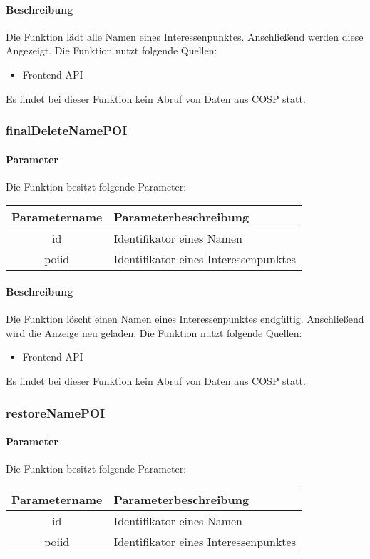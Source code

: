 \paragraph{Beschreibung} Die Funktion lädt alle Namen eines Interessenpunktes. Anschließend werden diese Angezeigt. Die Funktion nutzt folgende Quellen:
\begin{itemize}
	\item Frontend-API
\end{itemize}
Es findet bei dieser Funktion kein Abruf von Daten aus {\glqq COSP\grqq} statt.
\subsubsection{finalDeleteNamePOI}
\paragraph{Parameter} Die Funktion besitzt folgende Parameter:
\begin{table}[H]
	\begin{tabular}{|c|p{11cm}|}
		\hline
		\textbf{Parametername} & \textbf{Parameterbeschreibung} \\ \hline
		id    & Identifikator eines Namen \\ \hline
		poiid & Identifikator eines Interessenpunktes \\ \hline
	\end{tabular}
\end{table}
\paragraph{Beschreibung} Die Funktion löscht einen Namen eines Interessenpunktes endgültig. Anschließend wird die Anzeige neu geladen. Die Funktion nutzt folgende Quellen:
\begin{itemize}
	\item Frontend-API
\end{itemize}
Es findet bei dieser Funktion kein Abruf von Daten aus {\glqq COSP\grqq} statt.
\subsubsection{restoreNamePOI}
\paragraph{Parameter} Die Funktion besitzt folgende Parameter:
\begin{table}[H]
	\begin{tabular}{|c|p{11cm}|}
		\hline
		\textbf{Parametername} & \textbf{Parameterbeschreibung} \\ \hline
		id    & Identifikator eines Namen \\ \hline
		poiid & Identifikator eines Interessenpunktes \\ \hline
	\end{tabular}
\end{table}
